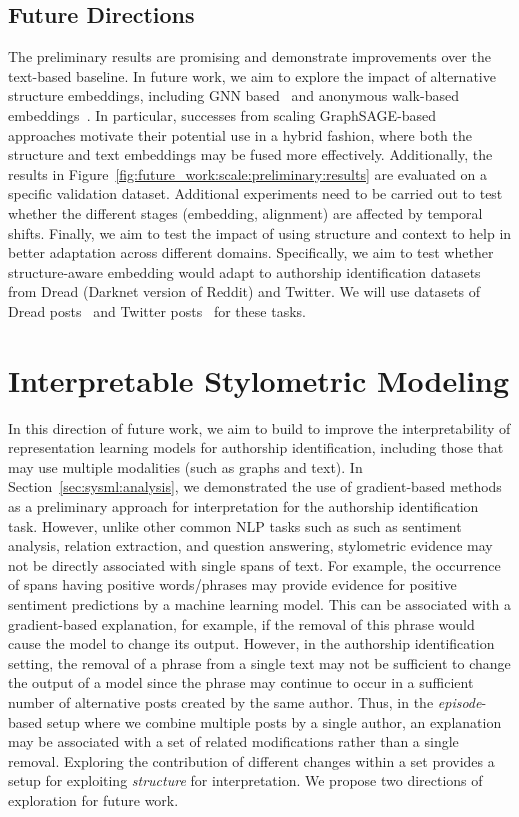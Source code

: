 \subsection{Future Directions}
The preliminary results are promising and demonstrate improvements over the text-based baseline.
In future work, we aim to explore the impact of alternative structure embeddings, including GNN based~\cite{velivckovic2018graph,hamilton2017inductive} and anonymous walk-based embeddings~\citep{ivanov2018anonymous,wang2020inductive}.
In particular, successes from scaling GraphSAGE-based~\cite{hamilton2017inductive,ying2018graph} approaches motivate their potential use in a hybrid fashion, where both the structure and text embeddings may be fused more effectively.
Additionally, the results in Figure~\ref{fig:future_work:scale:preliminary:results} are evaluated on a specific validation dataset.
Additional experiments need to be carried out to test whether the different stages (embedding, alignment) are affected by temporal shifts.
Finally, we aim to test the impact of using structure and context to help in better adaptation across different domains.
Specifically, we aim to test whether structure-aware embedding would adapt to authorship identification datasets from Dread (Darknet version of Reddit) and Twitter.
We will use datasets of Dread posts~\cite{pastrana2018crimebb} and Twitter posts~\cite{andrews2019learning} for these tasks.

\section{Interpretable Stylometric Modeling}
\label{sec:future_work:interpret}
In this direction of future work, we aim to build to improve the interpretability of representation learning models for authorship identification, including those that may use multiple modalities (such as graphs and text).
In Section~\ref{sec:sysml:analysis}, we demonstrated the use of gradient-based methods as a preliminary approach for interpretation for the authorship identification task.
However, unlike other common NLP tasks such as such as sentiment analysis, relation extraction, and question answering, stylometric evidence may not be directly associated with single spans of text.
For example, the occurrence of spans having positive words/phrases may provide evidence for positive sentiment predictions by a machine learning model.
This can be associated with a gradient-based explanation, for example, if the removal of this phrase would cause the model to change its output.
However, in the authorship identification setting, the removal of a phrase from a single text may not be sufficient to change the output of a model since the phrase may continue to occur in a sufficient number of alternative posts created by the same author.
Thus, in the \textit{episode}-based setup where we combine multiple posts by a single author, an explanation may be associated with a set of related modifications rather than a single removal.
Exploring the contribution of different changes within a set provides a setup for exploiting \textit{structure} for interpretation.
We propose two directions of exploration for future work.


